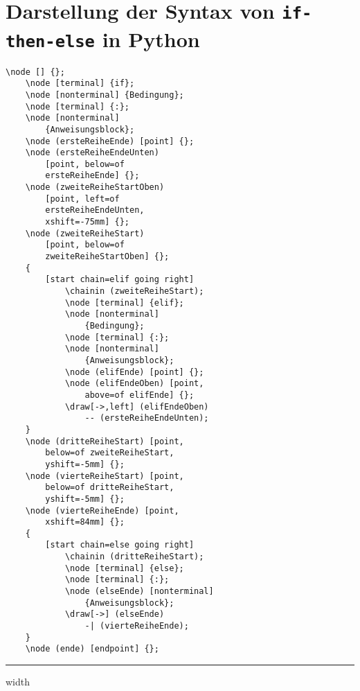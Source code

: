 \documentclass[a4paper]{scrartcl}
\begin{document}
 \section*{Darstellung der Syntax von \texttt{if-then-else} in Python}
 \begin{lstlisting}[gobble=2,basicstyle=\footnotesize,multicols=2,caption={}]
	\node [] {};
	\node [terminal] {if};
	\node [nonterminal] {Bedingung};
	\node [terminal] {:};
	\node [nonterminal] 
		{Anweisungsblock};
	\node (ersteReiheEnde) [point] {};
	\node (ersteReiheEndeUnten) 
		[point, below=of 
		ersteReiheEnde] {};
	\node (zweiteReiheStartOben) 
		[point, left=of 
		ersteReiheEndeUnten, 
		xshift=-75mm] {};
	\node (zweiteReiheStart) 
		[point, below=of 
		zweiteReiheStartOben] {};
	{
		[start chain=elif going right]
			\chainin (zweiteReiheStart);
			\node [terminal] {elif};
			\node [nonterminal]
				{Bedingung};
			\node [terminal] {:};
			\node [nonterminal] 
				{Anweisungsblock};
			\node (elifEnde) [point] {};
			\node (elifEndeOben) [point, 
				above=of elifEnde] {};
			\draw[->,left] (elifEndeOben)
				-- (ersteReiheEndeUnten);
	}
	\node (dritteReiheStart) [point, 
		below=of zweiteReiheStart, 
		yshift=-5mm] {};
	\node (vierteReiheStart) [point, 
		below=of dritteReiheStart, 
		yshift=-5mm] {};
	\node (vierteReiheEnde) [point, 
		xshift=84mm] {};
	{
		[start chain=else going right]
			\chainin (dritteReiheStart);
			\node [terminal] {else};
			\node [terminal] {:};
			\node (elseEnde) [nonterminal] 
				{Anweisungsblock};
			\draw[->] (elseEnde) 
				-| (vierteReiheEnde);
	}
	\node (ende) [endpoint] {};
 \end{lstlisting}
 \vspace{0.6cm}
 \hrule width \textwidth
 \vspace{1cm}
\end{document}
